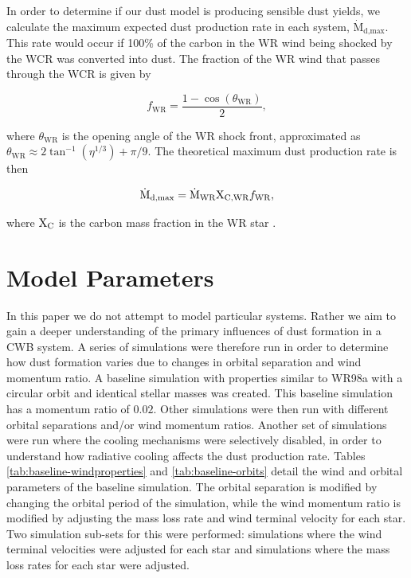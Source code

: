 \documentclass[fleqn,usenatbib]{mnras}
\begin{document}
In order to determine if our dust model is producing sensible dust yields, we calculate the maximum expected dust production rate in each system, $\dot{\text{M}}_\text{d,max}$.
This rate would occur if 100\% of the carbon in the WR wind being shocked by the WCR was converted into dust.
The fraction of the WR wind that passes through the WCR is given by

\begin{equation}
	f_\text{WR} = \frac{1 - \cos \left(\theta_\text{WR}\right)}{2} ,
\end{equation}

\noindent
where $\theta_\text{WR}$ is the opening angle of the WR shock front, approximated as $\theta_\text{WR} \approx 2 \tan^{-1} ( \eta^{1/3} ) + \pi/9$.
The theoretical maximum dust production rate is then

\begin{equation}
	\dot{\text{M}}_\text{d,max} = \dot{\text{M}}_\text{WR} \text X_\text{C,WR} f_\text{WR},
\end{equation}

\noindent
 where $\text X_\text{C}$ is the carbon mass fraction in the WR star
 \citep{pittardCollidingStellarWinds2018}.


\section{Model Parameters}
\label{sec:p1-model-parameters}

In this paper we do not attempt to model particular systems.
Rather we aim to gain a deeper understanding of the primary influences of dust formation in a CWB system.
A series of simulations were therefore run in order to determine how dust formation varies due to changes in orbital separation and wind momentum ratio.
A baseline simulation with properties similar to WR98a with a circular orbit and identical stellar masses was created.
This baseline simulation has a momentum ratio of $0.02$.
Other simulations were then run with different orbital separations and/or wind momentum ratios.
Another set of simulations were run where the cooling mechanisms were selectively disabled, in order to understand how radiative cooling affects the dust production rate.
Tables \ref{tab:baseline-windproperties} and \ref{tab:baseline-orbits} detail the wind and orbital parameters of the baseline simulation.
The orbital separation is modified by changing the orbital period of the simulation, while the wind momentum ratio is modified by adjusting the mass loss rate and wind terminal velocity for each star.
Two simulation sub-sets for this were performed: simulations where the wind terminal velocities were adjusted for each star and simulations where the mass loss rates for each star were adjusted.
\end{document}
